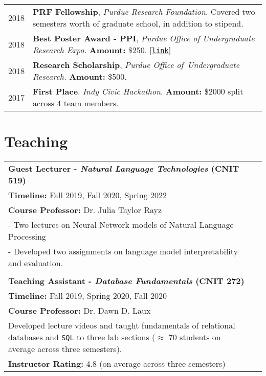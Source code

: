 \documentclass[11pt]{article}
\newcommand{\link}[1]{[\href{#1}{\texttt{link}}]}
\begin{document}
\begin{longtable}{p{}  p{} }
2018 & \textbf{PRF Fellowship}, \textit{Purdue Research Foundation}. Covered two semesters worth of graduate school, in addition to stipend.\\
2018 & \textbf{Best Poster Award - PPI}, \textit{Purdue Office of Undergraduate Research Expo.} \textbf{Amount:} \$250. \link{https://www.purdue.edu/undergrad-research/conferences/spring/archive/past-winners.php}\\
2018 & \textbf{Research Scholarship}, \textit{Purdue Office of~Undergraduate Research.} \textbf{Amount:} \$500.\\
2017 & \textbf{First Place}. \textit{Indy Civic Hackathon}. \textbf{Amount:} \$2000 split across 4 team members.
\end{longtable}

\renewcommand*{\arraystretch}{1}
\section*{Teaching}
\begin{tabularx}{\textwidth}{@{}p{}l}
\large \textbf{Guest Lecturer - \textit{Natural Language Technologies} (CNIT 519)}\\
\textbf{Timeline:} Fall 2019, Fall 2020, Spring 2022\\
\textbf{Course Professor:} Dr. Julia Taylor Rayz\\
- Two lectures on Neural Network models of Natural Language Processing\\
- Developed two assignments on language model interpretability and evaluation.\\\\
\large \textbf{Teaching Assistant - \textit{Database Fundamentals} (CNIT 272)}\\
\textbf{Timeline:} Fall 2019, Spring 2020, Fall 2020\\
\textbf{Course Professor:} Dr. Dawn D. Laux\\
Developed lecture videos and taught fundamentals of relational databases and \texttt{SQL} to \underline{three} lab sections ($\approx$ 70 students on average across three semesters).\\
\textbf{Instructor Rating:} 4.8 (on average across three semesters)
\end{tabularx}
\end{document}
